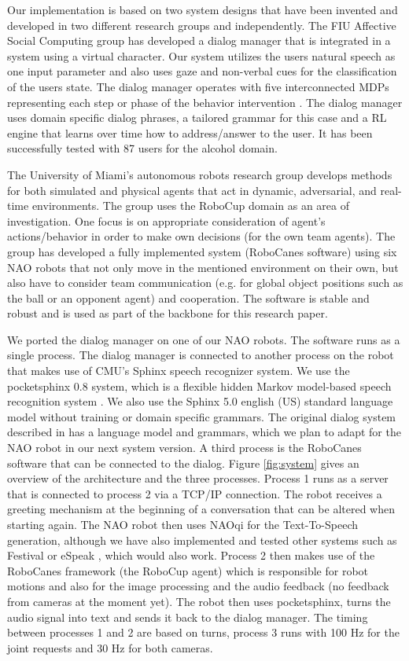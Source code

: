 \documentclass[letterpaper]{article}
\begin{document}
Our implementation is based on two system designs that have been
invented and developed in two different research groups and independently. The FIU Affective Social Computing group has developed a dialog manager that is integrated in a system using a virtual 
character.  Our system utilizes the users natural speech as one input parameter and also uses gaze
and non-verbal cues for the classification of the users state. The dialog manager operates with five
interconnected MDPs representing each step or phase of the behavior intervention 
\cite{YASCLL14}. The dialog manager uses domain specific dialog phrases, a tailored grammar for
this case and a RL engine that learns over time how to address/answer to the user. It has been
successfully tested with 87 users for the alcohol domain.

The University of Miami's autonomous robots research group develops methods for both simulated and
physical agents that act in dynamic, adversarial, and real-time environments. The group uses the
RoboCup domain as an area of investigation. One  focus is on appropriate consideration of agent's
actions/behavior in order to make own decisions (for the own team agents). The group has developed a
fully implemented system (RoboCanes software) using six NAO robots that not only move in the
mentioned environment on their own, but also have to consider team communication (e.g. for global
object positions such as the ball or an opponent agent) and cooperation. The software is stable and
robust and is used as part of the backbone for this research paper.

We ported the dialog manager on one of our NAO robots. The software runs as a single process. The
dialog manager is connected to another process on the robot that makes use of CMU's Sphinx speech
recognizer system. We use the pocketsphinx 0.8 system, which is a flexible hidden Markov model-based
speech recognition system \cite{huggins2006pocketsphinx}. We also use the Sphinx 5.0 english (US)
standard language model without training or domain specific grammars.  The original dialog system described in \cite{YASCLL14} has a language model and grammars, which we plan to  adapt for the NAO robot in our next system version. A third process is the
RoboCanes software that can be connected to the dialog. Figure \ref{fig:system} gives an overview of
the architecture and the three processes. Process 1 runs as a server that is connected to process 2
via a TCP/IP connection. The robot receives a greeting mechanism  at the beginning of a conversation
that can be altered when starting again. The NAO robot then uses NAOqi for the Text-To-Speech
generation, although we have also implemented and tested other systems such as Festival \cite{taylor1998architecture} or eSpeak \cite{eSpeak},
which would also work. Process 2 then makes use of the RoboCanes framework (the RoboCup agent) which
is responsible for robot motions and also for the image processing and the audio feedback (no 
feedback from cameras at the moment yet). The robot then uses pocketsphinx, turns the audio signal
into text and sends it back to the dialog manager. The timing between processes 1 and 2 are based on 
turns, process 3 runs with 100 Hz for the joint requests and 30 Hz for both cameras.
\end{document}
